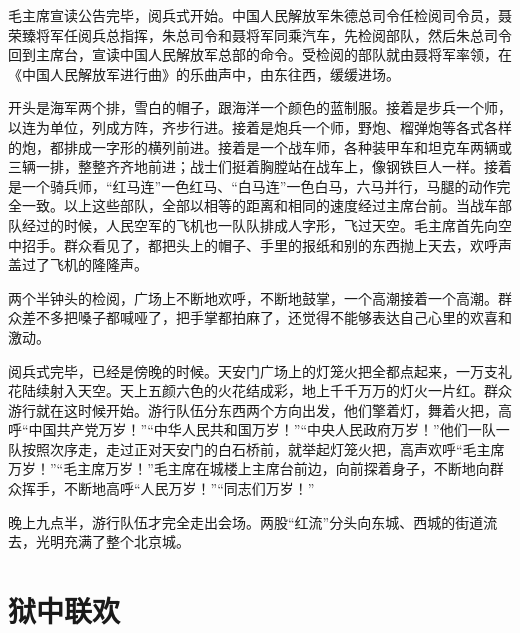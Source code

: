 \documentclass[12pt,UTF-8,openany]{ctexbook}
\begin{document}
\begin{large}
    毛主席宣读公告完毕，阅兵式开始。中国人民解放军朱德总司令任检阅司令员，聂荣臻将军任阅兵总指挥，朱总司令和聂将军同乘汽车，先检阅部队，然后朱总司令回到主席台，宣读中国人民解放军总部的命令。受检阅的部队就由聂将军率领，在《中国人民解放军进行曲》的乐曲声中，由东往西，缓缓进场。
    
    开头是海军两个排，雪白的帽子，跟海洋一个颜色的蓝制服。接着是步兵一个师，以连为单位，列成方阵，齐步行进。接着是炮兵一个师，野炮、榴弹炮等各式各样的炮，都排成一字形的横列前进。接着是一个战车师，各种装甲车和坦克车两辆或三辆一排，整整齐齐地前进；战士们挺着胸膛站在战车上，像钢铁巨人一样。接着是一个骑兵师，“红马连”一色红马、“白马连”一色白马，六马并行，马腿的动作完全一致。以上这些部队，全部以相等的距离和相同的速度经过主席台前。当战车部队经过的时候，人民空军的飞机也一队队排成人字形，飞过天空。毛主席首先向空中招手。群众看见了，都把头上的帽子、手里的报纸和别的东西抛上天去，欢呼声盖过了飞机的隆隆声。
    
    两个半钟头的检阅，广场上不断地欢呼，不断地鼓掌，一个高潮接着一个高潮。群众差不多把嗓子都喊哑了，把手掌都拍麻了，还觉得不能够表达自己心里的欢喜和激动。
    
    阅兵式完毕，已经是傍晚的时候。天安门广场上的灯笼火把全都点起来，一万支礼花陆续射入天空。天上五颜六色的火花结成彩，地上千千万万的灯火一片红。群众游行就在这时候开始。游行队伍分东西两个方向出发，他们擎着灯，舞着火把，高呼“中国共产党万岁！”“中华人民共和国万岁！”“中央人民政府万岁！”他们一队一队按照次序走，走过正对天安门的白石桥前，就举起灯笼火把，高声欢呼“毛主席万岁！”“毛主席万岁！”毛主席在城楼上主席台前边，向前探着身子，不断地向群众挥手，不断地高呼“人民万岁！”“同志们万岁！”
    
    晚上九点半，游行队伍才完全走出会场。两股“红流”分头向东城、西城的街道流去，光明充满了整个北京城。
    
\end{large}



\chapter{狱中联欢}
\end{document}
